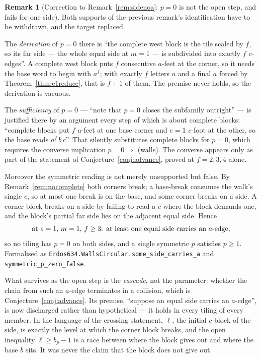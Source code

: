\documentclass[11pt,reqno]{amsart}
\theoremstyle{plain}
\theoremstyle{definition}
\newtheorem{remark}[theorem]{Remark}
\begin{document}
\begin{remark}[Correction to Remark~\ref{rem:sidenoa}: $p=0$ is not the open step, and fails for one side]\label{rem:pnotzero}
Both supports of the previous remark's identification have to be withdrawn, and the target replaced.

The \emph{derivation} of $p=0$ there is ``the complete west block is the tile scaled by $f$, so its
far side --- the whole equal side at $m=1$ --- is subdivided into exactly $f$ $c$-edges''. A complete
west block puts $f$ consecutive $a$-feet at the corner, so it needs the base word to begin with
$a^f$; with exactly $f$ letters $a$ and a final $a$ forced by Theorem~\ref{thm:e1reduce}, that is
$f+1$ of them. The premise never holds, so the derivation is vacuous.

The \emph{sufficiency} of $p=0$ --- ``note that $p=0$ closes the subfamily outright'' --- is
justified there by an argument every step of which is about complete blocks: ``complete blocks put
$f$ $a$-feet at one base corner and $e=1$ $c$-foot at the other, so the base reads $a^f\,b\,c$''.
That silently substitutes complete blocks for $p=0$, which requires the converse implication
$p=0\Rightarrow$ (walls). The converse appears only as part of the statement of
Conjecture~\ref{conj:advance}, proved at $f=2,3,4$ alone.

Moreover the symmetric reading is not merely unsupported but false. By
Remark~\ref{rem:nocomplete} both corners break; a base-break consumes the walk's single $c$, so at
most one break is on the base, and some corner breaks on a side. A corner block breaks on a side by
failing to read a $c$ where the block demands one, and the block's partial far side lies on the
adjacent equal side. Hence
\[
  \textup{at $e=1$, $m=1$, $f\ge3$: at least one equal side carries an }a\textup{-edge,}
\]
so no tiling has $p=0$ on both sides, and a single symmetric $p$ satisfies $p\ge1$.
Formalised as \texttt{Erdos634.WallsCircular.some\_side\_carries\_a} and
\texttt{symmetric\_p\_zero\_false}.

What survives as the open step is the \emph{cascade}, not the parameter: whether the chain from such
an $a$-edge terminates in a collision, which is Conjecture~\ref{conj:advance}. Its premise,
``suppose an equal side carries an $a$-edge'', is now discharged rather than hypothetical --- it
holds in every tiling of every member. In the language of the crossing statement, $\ell$, the
initial $c$-block of the side, is exactly the level at which the corner block breaks, and the open
inequality $\ell\ge b_p-1$ is a race between where the block gives out and where the base $b$ sits.
It was never the claim that the block does not give out.
\end{remark}
\end{document}
